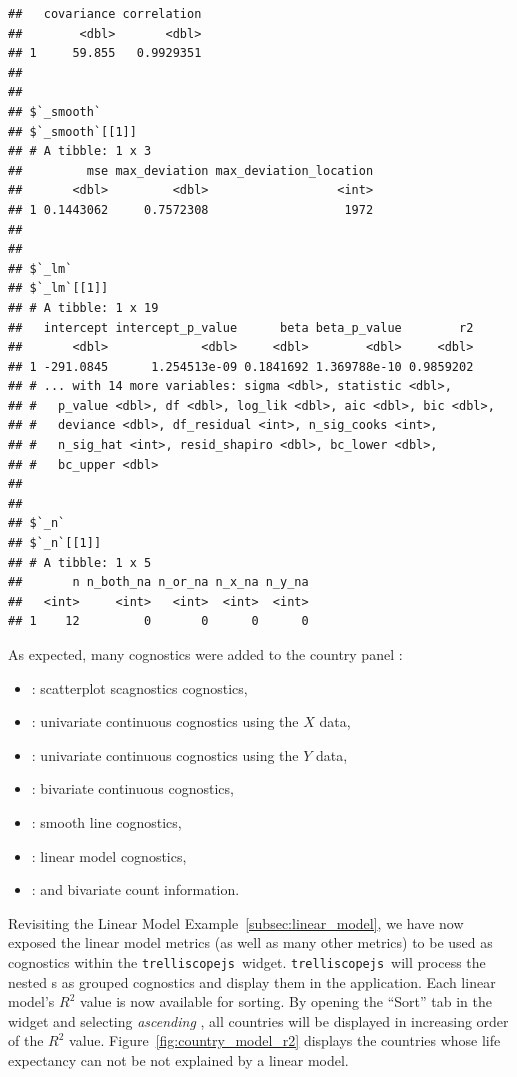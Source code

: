 \documentclass[stat,dissertation]{puthesis}\usepackage[]{graphicx}\usepackage{xcolor}
\makeatletter
\newenvironment{kframe}{%
 \def\at@end@of@kframe{}%
 \ifinner\ifhmode%
  \def\at@end@of@kframe{\end{minipage}}%
  \begin{minipage}{\columnwidth}%
 \fi\fi%
 \def\FrameCommand##1{\hskip\@totalleftmargin \hskip-\fboxsep
 \colorbox{shadecolor}{##1}\hskip-\fboxsep
     \hskip-\linewidth \hskip-\@totalleftmargin \hskip\columnwidth}%
 \MakeFramed {\advance\hsize-\width
   \@totalleftmargin\z@ \linewidth\hsize
   \@setminipage}}%
 {\par\unskip\endMakeFramed%
 \at@end@of@kframe}
\newenvironment{knitrout}{}{} %
\renewenvironment{knitrout}{\setstretch{1}}{}
\newcommand{\pkg}[1]{\texttt{#1}}
\newcommand{\trelliscopejs}{\pkg{trelliscopejs}}
\makeatother
\begin{document}
\begin{knitrout}
\begin{kframe}
\begin{verbatim}
##   covariance correlation
##        <dbl>       <dbl>
## 1     59.855   0.9929351
## 
## 
## $`_smooth`
## $`_smooth`[[1]]
## # A tibble: 1 x 3
##         mse max_deviation max_deviation_location
##       <dbl>         <dbl>                  <int>
## 1 0.1443062     0.7572308                   1972
## 
## 
## $`_lm`
## $`_lm`[[1]]
## # A tibble: 1 x 19
##   intercept intercept_p_value      beta beta_p_value        r2
##       <dbl>             <dbl>     <dbl>        <dbl>     <dbl>
## 1 -291.0845      1.254513e-09 0.1841692 1.369788e-10 0.9859202
## # ... with 14 more variables: sigma <dbl>, statistic <dbl>,
## #   p_value <dbl>, df <dbl>, log_lik <dbl>, aic <dbl>, bic <dbl>,
## #   deviance <dbl>, df_residual <int>, n_sig_cooks <int>,
## #   n_sig_hat <int>, resid_shapiro <dbl>, bc_lower <dbl>,
## #   bc_upper <dbl>
## 
## 
## $`_n`
## $`_n`[[1]]
## # A tibble: 1 x 5
##       n n_both_na n_or_na n_x_na n_y_na
##   <int>     <int>   <int>  <int>  <int>
## 1    12         0       0      0      0
\end{verbatim}
\end{kframe}
\end{knitrout}

As expected, many cognostics were added to the country panel :

\begin{itemize}
  \item {}: scatterplot scagnostics cognostics,
  \item {}: univariate continuous cognostics using the $X$ data,
  \item {}: univariate continuous cognostics using the $Y$ data,
  \item {}: bivariate continuous cognostics,
  \item {}: smooth line cognostics,
  \item {}: linear model cognostics,
  \item {}: and bivariate count information.
\end{itemize}

Revisiting the Linear Model Example~\ref{subsec:linear_model}, we have now exposed the linear model metrics (as well as many other metrics) to be used as cognostics within the \trelliscopejs~widget.  \trelliscopejs~will process the nested s as grouped cognostics and display them in the application.  Each linear model's $R^2$ value is now available for sorting.  By opening the ``Sort'' tab in the widget and selecting \emph{ascending} , all countries will be displayed in increasing order of the $R^2$ value.  Figure~\ref{fig:country_model_r2} displays the countries whose life expectancy can not be not explained by a linear model.
\end{document}
